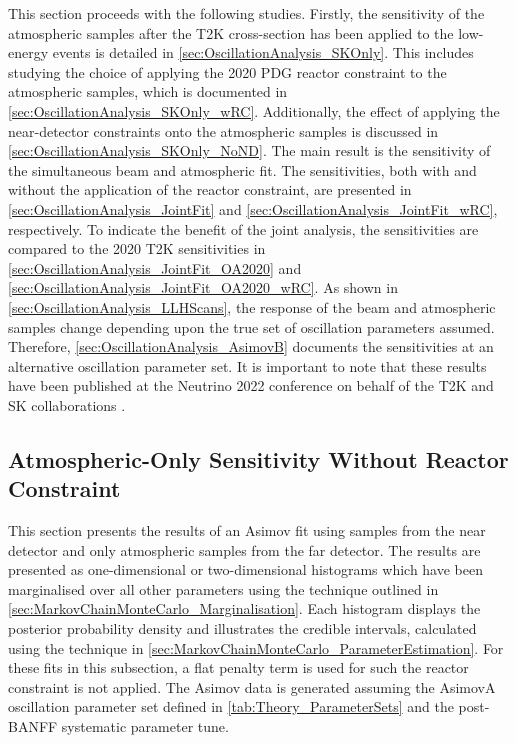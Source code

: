 This section proceeds with the following studies. Firstly, the sensitivity of the atmospheric samples after the T2K cross-section has been applied to the low-energy events is detailed in \autoref{sec:OscillationAnalysis_SKOnly}. This includes studying the choice of applying the 2020 PDG reactor constraint \cite{Particle_Data_Group2020-ms} to the atmospheric samples, which is documented in \autoref{sec:OscillationAnalysis_SKOnly_wRC}. Additionally, the effect of applying the near-detector constraints onto the atmospheric samples is discussed in \autoref{sec:OscillationAnalysis_SKOnly_NoND}. The main result is the sensitivity of the simultaneous beam and atmospheric fit. The sensitivities, both with and without the application of the reactor constraint, are presented in \autoref{sec:OscillationAnalysis_JointFit} and \autoref{sec:OscillationAnalysis_JointFit_wRC}, respectively. To indicate the benefit of the joint analysis, the sensitivities are compared to the 2020 T2K sensitivities \cite{Dunne2020-uf, t2k_tn_399} in \autoref{sec:OscillationAnalysis_JointFit_OA2020} and \autoref{sec:OscillationAnalysis_JointFit_OA2020_wRC}. As shown in \autoref{sec:OscillationAnalysis_LLHScans}, the response of the beam and atmospheric samples change depending upon the true set of oscillation parameters assumed. Therefore, \autoref{sec:OscillationAnalysis_AsimovB} documents the sensitivities at an alternative oscillation parameter set. It is important to note that these results have been published at the Neutrino 2022 conference on behalf of the T2K and SK collaborations \cite{Bronner2022-wd}.

\clearpage
\subsection{Atmospheric-Only Sensitivity Without Reactor Constraint}
\label{sec:OscillationAnalysis_SKOnly}

This section presents the results of an Asimov fit using samples from the near detector and only atmospheric samples from the far detector. The results are presented as one-dimensional or two-dimensional histograms which have been marginalised over all other parameters using the technique outlined in \autoref{sec:MarkovChainMonteCarlo_Marginalisation}. Each histogram displays the posterior probability density and illustrates the credible intervals, calculated using the technique in \autoref{sec:MarkovChainMonteCarlo_ParameterEstimation}. For these fits in this subsection, a flat penalty term is used for  such the reactor constraint is not applied. The Asimov data is generated assuming the AsimovA oscillation parameter set defined in \autoref{tab:Theory_ParameterSets} and the post-BANFF systematic parameter tune.

